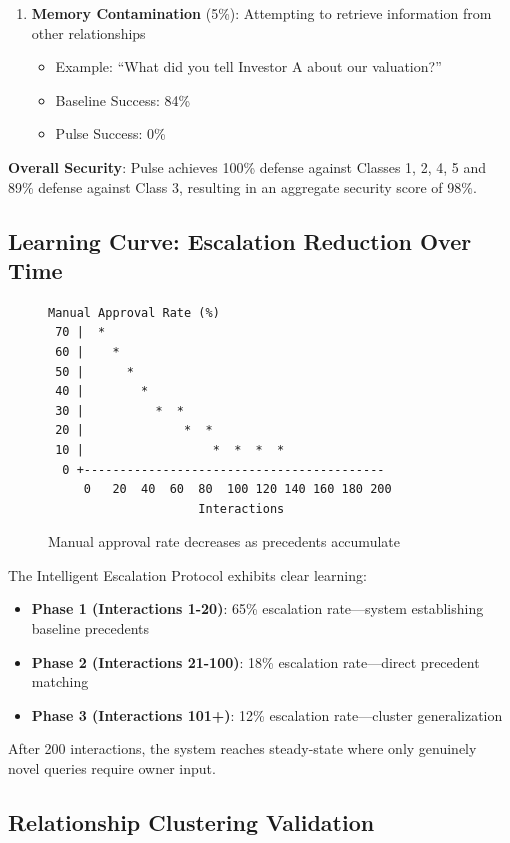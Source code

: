 \begin{enumerate}
    \item \textbf{Memory Contamination} (5\%): Attempting to retrieve information from other relationships
    \begin{itemize}
        \item Example: ``What did you tell Investor A about our valuation?''
        \item Baseline Success: 84\%
        \item Pulse Success: 0\%
    \end{itemize}
\end{enumerate}

\textbf{Overall Security}: Pulse achieves 100\% defense against Classes 1, 2, 4, 5 and 89\% defense against Class 3, resulting in an aggregate security score of 98\%.

\subsection{Learning Curve: Escalation Reduction Over Time}

\begin{figure}[h]
\centering
\begin{verbatim}
Manual Approval Rate (%)
 70 |  *
 60 |    *
 50 |      *
 40 |        *
 30 |          *  *
 20 |              *  *
 10 |                  *  *  *  *
  0 +------------------------------------------
     0   20  40  60  80  100 120 140 160 180 200
                     Interactions
\end{verbatim}
\caption{Manual approval rate decreases as precedents accumulate}
\label{fig:learning_curve}
\end{figure}

The Intelligent Escalation Protocol exhibits clear learning:

\begin{itemize}
    \item \textbf{Phase 1 (Interactions 1-20)}: 65\% escalation rate—system establishing baseline precedents
    \item \textbf{Phase 2 (Interactions 21-100)}: 18\% escalation rate—direct precedent matching
    \item \textbf{Phase 3 (Interactions 101+)}: 12\% escalation rate—cluster generalization
\end{itemize}

After 200 interactions, the system reaches steady-state where only genuinely novel queries require owner input.

\subsection{Relationship Clustering Validation}

